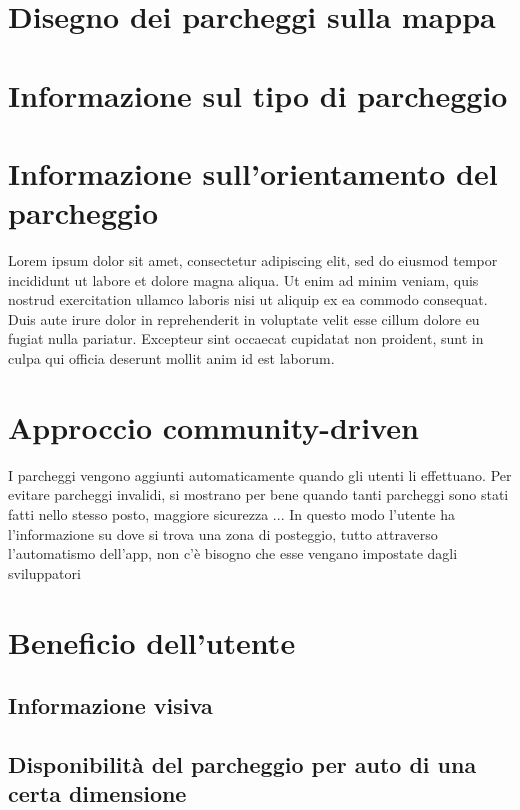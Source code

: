 \section{Disegno dei parcheggi sulla mappa} 


\section{Informazione sul tipo di parcheggio} 


\section{Informazione sull'orientamento del parcheggio} Lorem ipsum dolor sit amet, consectetur adipiscing elit, sed do eiusmod tempor incididunt ut labore et dolore magna aliqua. Ut enim ad minim veniam, quis nostrud exercitation ullamco laboris nisi ut aliquip ex ea commodo consequat. Duis aute irure dolor in reprehenderit in voluptate velit esse cillum dolore eu fugiat nulla pariatur. Excepteur sint occaecat cupidatat non proident, sunt in culpa qui officia deserunt mollit anim id est laborum.

\section{Approccio community-driven}

I parcheggi vengono aggiunti automaticamente quando gli utenti li effettuano. 
Per evitare parcheggi invalidi, si mostrano per bene quando tanti parcheggi sono stati
fatti nello stesso posto, maggiore sicurezza ...
In questo modo l'utente ha l'informazione su dove si trova una zona di posteggio, tutto
attraverso l'automatismo dell'app, non c'è bisogno che esse vengano impostate dagli sviluppatori

\section{Beneficio dell'utente} 

\subsection{Informazione visiva}

\subsection{Disponibilità del parcheggio per auto di una certa dimensione}
